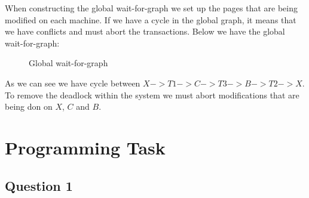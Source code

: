 \documentclass{article}      %
\begin{document}
When constructing the global wait-for-graph we set up the pages that are being modified on each machine. If we have a cycle in the global graph, it means that we have conflicts and must abort the transactions. Below we have the global wait-for-graph: \\

\begin{figure}[ht]
\centering

{%
\setlength{\fboxsep}{5pt}%
%
}%
\caption{Global wait-for-graph\label{overflow}}
\end{figure}

As we can see we have cycle between  $X -> T1 -> C -> T3 -> B -> T2 -> X$. To remove the deadlock within the system we must abort modifications that are being don on $X$, $C$ and $B$.

\section* {Programming Task}

\subsection* {Question 1}
\end{document}
